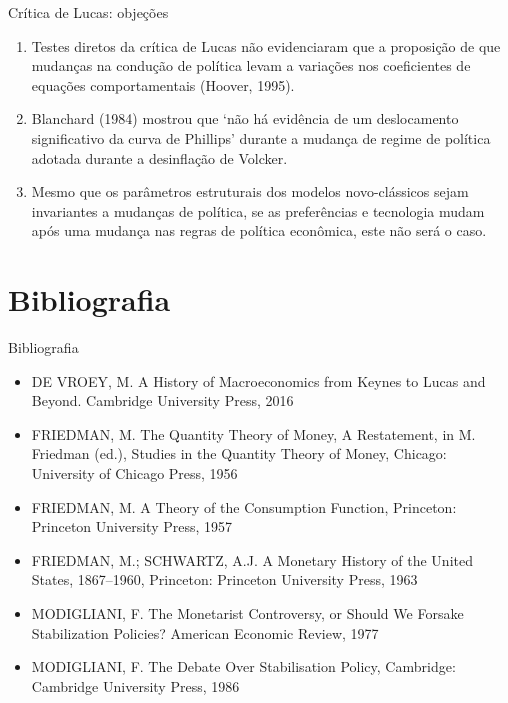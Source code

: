 \documentclass[10pt]{beamer}
\begin{document}
\begin{frame}{Crítica de Lucas: objeções}
    \begin{enumerate}
        \item Testes diretos da crítica de Lucas não evidenciaram que a proposição de que mudanças na condução de política levam a variações nos coeficientes de equações comportamentais (Hoover, 1995).
        \bigskip
        \item Blanchard (1984) mostrou que `não há evidência de um deslocamento significativo da curva de Phillips' durante a mudança de regime de política adotada durante a desinflação de Volcker.
        \bigskip
        \item Mesmo que os parâmetros estruturais dos modelos novo-clássicos sejam invariantes a mudanças de política, se as preferências e tecnologia mudam após uma mudança nas regras de política econômica, este não será o caso.
    \end{enumerate}
\end{frame}

\section{Bibliografia}
\begin{frame}{ Bibliografia}
    \begin{itemize}                        
        \item DE VROEY, M. A History of Macroeconomics from Keynes to Lucas and Beyond. Cambridge University Press, 2016\medskip
        \item FRIEDMAN, M. The Quantity Theory of Money, A Restatement, in M. Friedman (ed.), Studies in the Quantity Theory of Money, Chicago: University of Chicago Press, 1956 \medskip
        \item FRIEDMAN, M. A Theory of the Consumption Function, Princeton: Princeton University Press, 1957\medskip
        \item FRIEDMAN, M.; SCHWARTZ, A.J. A Monetary History of the United States, 1867–1960, Princeton: Princeton University Press, 1963\medskip
        \item MODIGLIANI, F. The Monetarist Controversy, or Should We Forsake Stabilization Policies? American Economic Review, 1977\medskip
        \item MODIGLIANI, F. The Debate Over Stabilisation Policy, Cambridge: Cambridge University Press, 1986\medskip        
    \end{itemize}
\end{frame}
\end{document}
